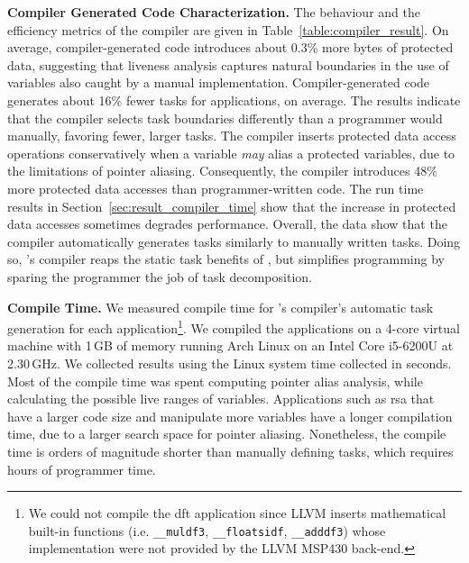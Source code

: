 \textbf{\sys Compiler Generated Code Characterization.} The behaviour and the efficiency metrics of the \sys compiler are given in Table~\ref{table:compiler_result}.  
%
%
On average, compiler-generated code introduces about 0.3\% more bytes of protected data, suggesting that liveness analysis captures natural boundaries in the use of variables also caught by a manual implementation. Compiler-generated code generates about 16\% fewer tasks for applications, on average. The results indicate that the \sys compiler selects task boundaries differently than a programmer would manually, favoring fewer, larger tasks. The \sys compiler inserts protected data access operations conservatively when a variable {\em may} alias a protected variables, due to the limitations of pointer aliasing. Consequently, the \sys compiler introduces 48\% more protected data accesses than programmer-written code. The run time results in Section~\ref{sec:result_compiler_time} show that the increase in protected data
accesses sometimes degrades performance. Overall, the data show that the compiler automatically generates tasks similarly to manually written tasks. Doing so, \sys's compiler reaps the static task benefits of \sys, but simplifies programming by sparing the programmer the job of task decomposition.

\textbf{Compile Time.} We measured compile time for \sys's compiler's automatic task generation for each application\footnote{We could not compile the dft application since LLVM inserts mathematical built-in functions (i.e. \texttt{\_\_muldf3}, \texttt{\_\_floatsidf}, \texttt{\_\_adddf3}) whose implementation were not provided by the LLVM MSP430 back-end.}. We compiled the applications on a 4-core virtual machine with 1\,GB of memory running Arch Linux on an Intel Core i5-6200U at 2.30\,GHz. We collected results using the Linux system time collected in seconds. Most of the compile time was spent computing pointer alias analysis, while calculating the possible live ranges of variables. Applications such as rsa that have a larger code size and manipulate more variables have a longer compilation time, due to a larger search space for pointer aliasing. Nonetheless, the compile time is orders of magnitude shorter than manually defining tasks, which requires hours of programmer time. %

